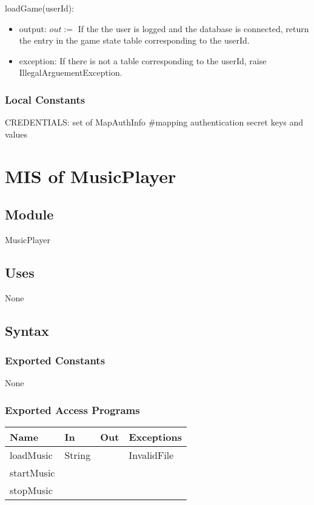 \documentclass[12pt, titlepage]{article}
\begin{document}
\noindent loadGame(userId):
\begin{itemize}
\item output: $out := $ If the the user is logged and the database is connected, return the entry in the game state table corresponding to the userId.
\item exception: If there is not a table corresponding to the userId, raise IllegalArguementException.
\end{itemize}

\subsubsection{Local Constants}
CREDENTIALS: set of MapAuthInfo \#mapping authentication secret keys and values\\
\medskip
\newpage
\section{MIS of MusicPlayer}

\subsection{Module}

MusicPlayer

\subsection{Uses}

None

\subsection{Syntax}

\subsubsection{Exported Constants}
None

\subsubsection{Exported Access Programs}

\begin{center}
\begin{tabular}{p{4cm} p{4cm} p{4cm} p{4cm}}
\hline
\textbf{Name} & \textbf{In} & \textbf{Out} & \textbf{Exceptions} \\
\hline
loadMusic & String &  & InvalidFile \\
\hline
startMusic &  &  &  \\
\hline
stopMusic &  &  &  \\
\hline
\end{tabular}
\end{center}
\end{document}
